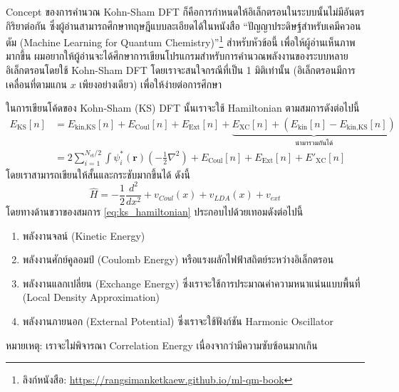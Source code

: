 Concept ของการคำนวณ Kohn-Sham DFT ก็คือการกำหนดให้อิเล็กตรอนในระบบนั้นไม่มีอันตรกิริยาต่อกัน ซึ่งผู้อ่านสามารถศึกษาทฤษฎีแบบละเอียดได้ในหนังสือ \enquote{ปัญญาประดิษฐ์สำหรับเคมีควอนตัม (Machine Learning for Quantum Chemistry)}\footnote{ลิงก์หนังสือ: \url{https://rangsimanketkaew.github.io/ml-qm-book}} สำหรับหัวข้อนี้ เพื่อให้ผู้อ่านเห็นภาพมากขึ้น ผมอยากให้ผู้อ่านจะได้ศึกษาการเขียนโปรแกรมสำหรับการคำนวณพลังงานของระบบหลายอิเล็กตรอนโดยใช้ Kohn-Sham DFT โดยเราจะสนใจกรณีที่เป็น 1 มิติเท่านั้น (อิเล็กตรอนมีการเคลื่อนที่ตามแกน $x$ เพียงอย่างเดียว) เพื่อให้ง่ายต่อการศึกษา

ในการเขียนโค้ดของ Kohn-Sham (KS) DFT นั้นเราจะใช้ Hamiltonian ตามสมการดังต่อไปนี้
%
\begin{align}
  \label{eq:kohn_sham_ener_1}
  E_{\text{KS}}[n] & = E_{\text{kin,KS}}[n] + E_{\text{Coul}}[n] + E_{\text{Ext}}[n] +
  \underbrace{E_{\text{XC}}[n] + (E_{\text{kin}}[n] - E_{\text{kin,KS}}[n])}_{\text{นำมารวมกันได้}}                          \\
  \label{eq:kohn_sham_ener_2}
                   & = 2 \sum^{N_{\text{el}}/2}_{i=1} \int \psi^{\ast}_{i}(\bm{r}) \left ( -\frac{1}{2}\nabla^{2} \right )
  + E_{\text{Coul}}[n] + E_{\text{Ext}}[n] + {E'}_{\text{XC}}[n]
\end{align}
%
โดยเราสามารถเขียนให้สั้นและกระชับมากขึ้นได้ ดังนี้
%
\begin{equation}\label{eq:ks_hamiltonian}
  \hat{H} 
  = 
  -\frac{1}{2} \frac{d^2}{dx^2} + v_{Coul}(x) + v_{LDA}(x) + v_{ext}
\end{equation}
%
โดยทางด้านขวาของสมการ \eqref{eq:ks_hamiltonian} ประกอบไปด้วยเทอมดังต่อไปนี้
%
\begin{enumerate}[topsep=0pt,noitemsep]
  \setlength\itemsep{0.5em}
  \item พลังงานจลน์ (Kinetic Energy)

  \item พลังงานศักย์คูลอมป์ (Coulomb Energy) หรือแรงผลักไฟฟ้าสถิตย์ระหว่างอิเล็กตรอน

  \item พลังงานแลกเปลี่ยน (Exchange Energy) ซึ่งเราจะใช้การประมาณค่าความหนาแน่นแบบพื้นที่ (Local Density Approximation)

  \item พลังงานภายนอก (External Potential) ซึ่งเราจะใช้ฟังก์ชัน Harmonic Oscillator
\end{enumerate}

\noindent หมายเหตุ: เราจะไม่พิจารณา Correlation Energy เนื่องจากว่ามีความซับซ้อนมากเกิน

